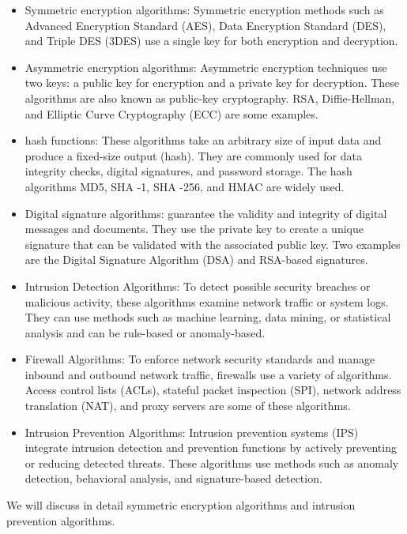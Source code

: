 \documentclass[a4paper,12pt]{report}
\begin{document}
\begin{itemize}

\item Symmetric encryption algorithms: Symmetric encryption methods such as Advanced Encryption Standard (AES), Data Encryption Standard (DES), and Triple DES (3DES) use a single key for both encryption and decryption.

\item Asymmetric encryption algorithms: Asymmetric encryption techniques use two keys: a public key for encryption and a private key for decryption. These algorithms are also known as public-key cryptography. RSA, Diffie-Hellman, and Elliptic Curve Cryptography (ECC) are some examples.

\item hash functions: These algorithms take an arbitrary size of input data and produce a fixed-size output (hash). They are commonly used for data integrity checks, digital signatures, and password storage. The hash algorithms MD5, SHA -1, SHA -256, and HMAC are widely used.

\item Digital signature algorithms: guarantee the validity and integrity of digital messages and documents. They use the private key to create a unique signature that can be validated with the associated public key. Two examples are the Digital Signature Algorithm (DSA) and RSA-based signatures.

\item Intrusion Detection Algorithms: To detect possible security breaches or malicious activity, these algorithms examine network traffic or system logs. They can use methods such as machine learning, data mining, or statistical analysis and can be rule-based or anomaly-based.

\item Firewall Algorithms: To enforce network security standards and manage inbound and outbound network traffic, firewalls use a variety of algorithms. Access control lists (ACLs), stateful packet inspection (SPI), network address translation (NAT), and proxy servers are some of these algorithms.

\item Intrusion Prevention Algorithms: Intrusion prevention systems (IPS) integrate intrusion detection and prevention functions by actively preventing or reducing detected threats. These algorithms use methods such as anomaly detection, behavioral analysis, and signature-based detection.

\end{itemize}
We will discuss in detail symmetric encryption algorithms and intrusion prevention algorithms.
\end{document}
